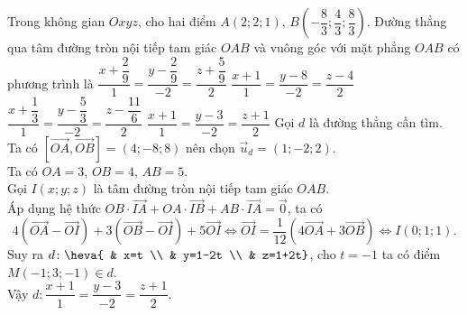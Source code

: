 \begin{ex}%
	Trong không gian $Oxyz$, cho hai điểm $A(2;2;1)$, $B\left(-\dfrac{8}{3};\dfrac{4}{3};\dfrac{8}{3}\right)$. Đường thẳng qua tâm đường tròn nội tiếp tam giác $OAB$ và vuông góc với mặt phẳng $OAB$ có phương trình là
	\choice
	{$\dfrac{x+\dfrac{2}{9}}{1}=\dfrac{y-\dfrac{2}{9}}{-2}=\dfrac{z+\dfrac{5}{9}}{2}$}
	{$\dfrac{x+1}{1}=\dfrac{y-8}{-2}=\dfrac{z-4}{2}$}
	{$\dfrac{x+\dfrac{1}{3}}{1}=\dfrac{y-\dfrac{5}{3}}{-2}=\dfrac{z-\dfrac{11}{6}}{2}$}
	{\True $\dfrac{x+1}{1}=\dfrac{y-3}{-2}=\dfrac{z+1}{2}$}
	\loigiai
	{
		Gọi $d$ là đường thẳng cần tìm.\\
		Ta có $\left[\overrightarrow{OA},\overrightarrow{OB}\right]=(4;-8;8)$ nên chọn $\overrightarrow{u}_{d}=(1;-2;2)$.\\
		Ta có $OA=3$, $OB=4$, $AB=5$.\\
		Gọi $I(x;y;z)$ là tâm đường tròn nội tiếp tam giác $OAB$.\\
		Áp dụng hệ thức $OB\cdot\overrightarrow{IA}+OA\cdot\overrightarrow{IB}+AB\cdot\overrightarrow{IA}=\overrightarrow{0}$, ta có
		$$4\left(\overrightarrow{OA}-\overrightarrow{OI}\right)+3\left(\overrightarrow{OB}-\overrightarrow{OI}\right)+5\overrightarrow{OI}\Leftrightarrow \overrightarrow{OI}=\dfrac{1}{12}\left(4\overrightarrow{OA}+3\overrightarrow{OB}\right)\Leftrightarrow I(0;1;1).$$
		Suy ra $d\colon \heva{ & x=t \\ & y=1-2t \\ & z=1+2t}$, cho $t=-1$ ta có điểm $M(-1;3;-1)\in d$.\\
		Vậy $d\colon \dfrac{x+1}{1}=\dfrac{y-3}{-2}=\dfrac{z+1}{2}$.
	}
\end{ex}

